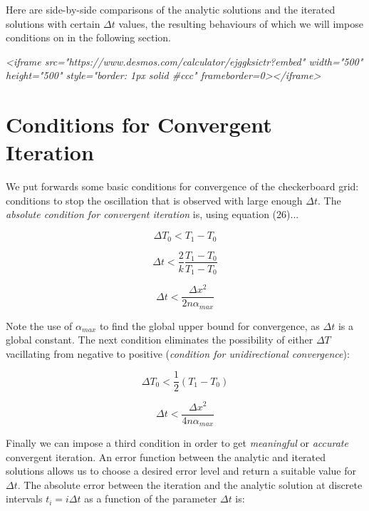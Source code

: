 \documentclass{article}
\begin{document}
Here are side-by-side comparisons of the analytic solutions and the iterated solutions with certain $\Delta t$ values, the resulting behaviours of which we will impose conditions on in the following section.

\emph{<iframe src="https://www.desmos.com/calculator/ejggksictr?embed" width="500" height="500" style="border: 1px solid #ccc" frameborder=0></iframe>}

\section{Conditions for Convergent Iteration}

We put forwards some basic conditions for convergence of the checkerboard grid: conditions to stop the oscillation that is observed with large enough $\Delta t$. The \emph{absolute condition for convergent iteration} is, using equation (26)...

\begin{equation*}
    \Delta T_0 < T_1-T_0
\end{equation*}

\begin{equation*}
    \Delta t < \frac{2}{k}\frac{T_1-T_0}{T_1-T_0}
\end{equation*}

\begin{equation}
    \Delta t < \frac{\Delta x^2}{2n\alpha_{max}}
\end{equation}

Note the use of $\alpha_{max}$ to find the global upper bound for convergence, as $\Delta t$ is a global constant. The next condition eliminates the possibility of either $\Delta T$ vacillating from negative to positive (\emph{condition for unidirectional convergence}):

\begin{equation*}
    \Delta T_0 < \frac{1}{2}(T_1-T_0)
\end{equation*}

\begin{equation}
    \Delta t < \frac{\Delta x^2}{4n\alpha_{max}}
\end{equation}

Finally we can impose a third condition in order to get \emph{meaningful} or \emph{accurate} convergent iteration. An error function between the analytic and iterated solutions allows us to choose a desired error level and return a suitable value for $\Delta t$. The absolute error between the iteration and the analytic solution at discrete intervals $t_i=i\Delta t$ as a function of the parameter $\Delta t$ is:
\end{document}
